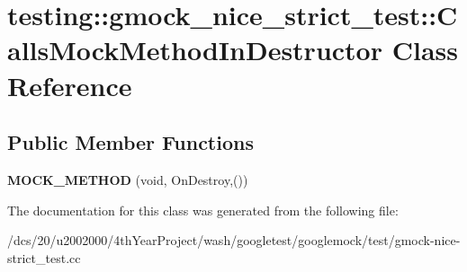 \hypertarget{classtesting_1_1gmock__nice__strict__test_1_1CallsMockMethodInDestructor}{}\section{testing\+:\+:gmock\+\_\+nice\+\_\+strict\+\_\+test\+:\+:Calls\+Mock\+Method\+In\+Destructor Class Reference}
\label{classtesting_1_1gmock__nice__strict__test_1_1CallsMockMethodInDestructor}
\subsection*{Public Member Functions}
\begin{DoxyCompactItemize}
\item 
\mbox{\label{classtesting_1_1gmock__nice__strict__test_1_1CallsMockMethodInDestructor_ad5247a82b025e2091154ff8c90bce46d}} 
{\bfseries M\+O\+C\+K\+\_\+\+M\+E\+T\+H\+OD} (void, On\+Destroy,())
\end{DoxyCompactItemize}


The documentation for this class was generated from the following file\+:\begin{DoxyCompactItemize}
\item 
/dcs/20/u2002000/4th\+Year\+Project/wash/googletest/googlemock/test/gmock-\/nice-\/strict\+\_\+test.\+cc\end{DoxyCompactItemize}
